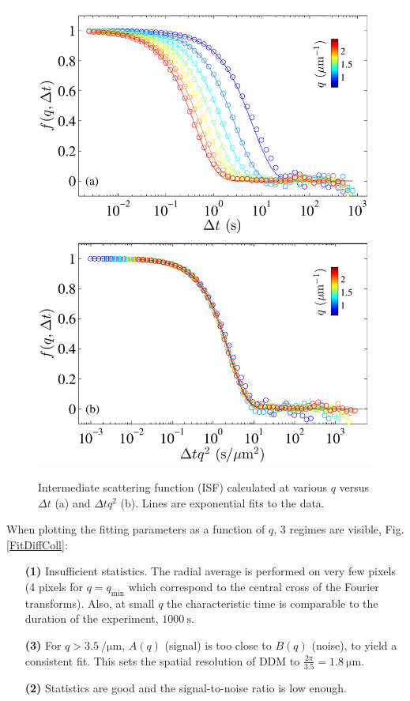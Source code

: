 \documentclass[%
 aip,
 jmp,%
 amsmath,amssymb,
reprint,%
]{revtex4-1}
\begin{document}
\begin{figure}
	\includegraphics[width=\linewidth]{ISFColloides.pdf}\\
	\caption{Intermediate scattering function (ISF) calculated at various $q$ versus $\Delta t$ (a) and $\Delta tq^2$ (b). Lines are exponential fits to the data.}
	\label{ISF}
\end{figure}

When plotting the fitting parameters as a function of $q$, 3 regimes are visible,  Fig.\ref{FitDiffColl}:
\begin{itemize}
\item[\textbf{(1)}] Insufficient statistics. The radial average is performed on very few pixels (4 pixels for $q = q_\text{min}$ which correspond to the central cross of the Fourier transforms).  Also, at small $q$ the characteristic time is comparable to the duration of the experiment, $\SI{1000}{\second}$.
\item[\textbf{(3)}] For  $q>\SI{3.5}{\per\micro\meter}$, $A(q)$ (signal) is too close to $B(q)$ (noise), to yield a consistent fit. This sets the spatial resolution of DDM to  $\frac{2\pi}{3.5} = \SI{1.8}{\micro\meter}$.
\item[\textbf{(2)}] Statistics are good and the signal-to-noise ratio is low enough.
\end{itemize}
\end{document}
